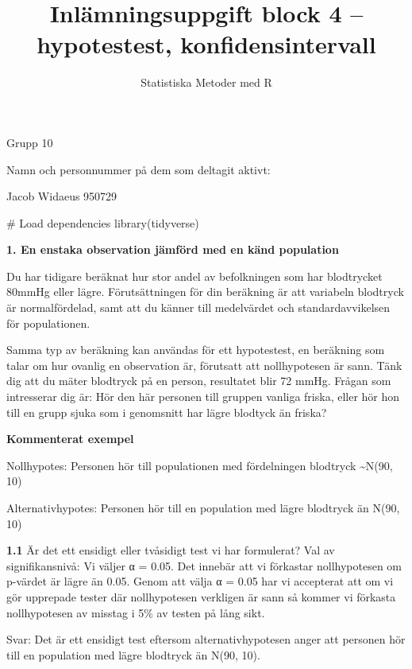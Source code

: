 \documentclass[
  letterpaper,
  DIV=11,
  numbers=noendperiod]{scrartcl}
\title{Inlämningsuppgift block 4 -- hypotestest, konfidensintervall}
\author{Statistiska Metoder med R}
\date{}
\newenvironment{Shaded}{\begin{snugshade}}{\end{snugshade}}
\newcommand{\CommentTok}[1]{\textcolor[rgb]{0.37,0.37,0.37}{#1}}
\newcommand{\FunctionTok}[1]{\textcolor[rgb]{0.28,0.35,0.67}{#1}}
\newcommand{\NormalTok}[1]{\textcolor[rgb]{0.00,0.23,0.31}{#1}}
\begin{document}
\maketitle


Grupp 10

Namn och personnummer på dem som deltagit aktivt:

Jacob Widaeus 950729

\hfill\break

\hfill\break

\begin{Shaded}
\begin{Highlighting}[]
\CommentTok{\# Load dependencies}
\FunctionTok{library}\NormalTok{(tidyverse)}
\end{Highlighting}
\end{Shaded}

\textbf{1. En enstaka observation jämförd med en känd population}

Du har tidigare beräknat hur stor andel av befolkningen som har
blodtrycket 80mmHg eller lägre. Förutsättningen för din beräkning är att
variabeln blodtryck är normalfördelad, samt att du känner till
medelvärdet och standardavvikelsen för populationen.

Samma typ av beräkning kan användas för ett hypotestest, en beräkning
som talar om hur ovanlig en observation är, förutsatt att nollhypotesen
är sann. Tänk dig att du mäter blodtryck på en person, resultatet blir
72 mmHg. Frågan som intresserar dig är: Hör den här personen till
gruppen vanliga friska, eller hör hon till en grupp sjuka som i
genomsnitt har lägre blodtyck än friska?

\textbf{Kommenterat exempel}

Nollhypotes: Personen hör till populationen med fördelningen blodtryck
\textasciitilde N(90, 10)

Alternativhypotes: Personen hör till en population med lägre blodtryck
än N(90, 10)

\textbf{1.1} Är det ett ensidigt eller tvåsidigt test vi har formulerat?
Val av signifikansnivå: Vi väljer α = 0.05. Det innebär att vi förkastar
nollhypotesen om p-värdet är lägre än 0.05. Genom att välja α = 0.05 har
vi accepterat att om vi gör upprepade tester där nollhypotesen verkligen
är sann så kommer vi förkasta nollhypotesen av misstag i 5\% av testen
på lång sikt.

\hfill\break
Svar: Det är ett ensidigt test eftersom alternativhypotesen anger att
personen hör till en population med lägre blodtryck än N(90, 10).\\
\end{document}
